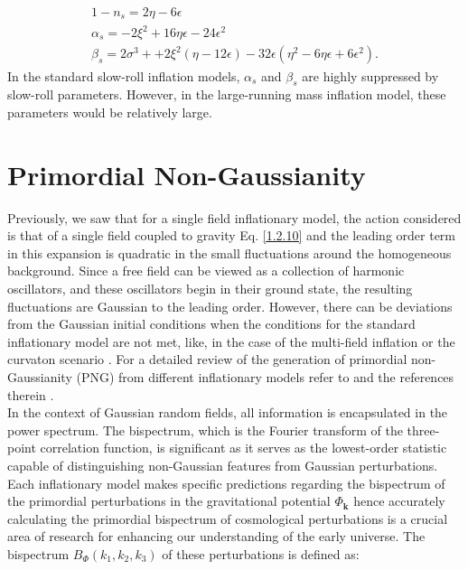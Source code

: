 \begin{align}
    1-n_{s} = 2\eta - 6\epsilon \\
    \alpha_s = -2\xi^2 + 16\eta\epsilon - 24\epsilon^2 \\
    \beta_{s} = 2\sigma^3 + + 2\xi^2(\eta -12\epsilon) - 32\epsilon(\eta^2 - 6\eta\epsilon + 6 \epsilon^2) \label{1.2.149}.
\end{align}
In the standard slow-roll inflation models, $\alpha_s$ and $\beta_{s}$ are highly suppressed by slow-roll parameters. However, in the large-running mass inflation model, these parameters would be
relatively large.

\section{Primordial Non-Gaussianity} \label{PNG}

Previously, we saw that for a single field inflationary model, the action considered is that of a single field coupled to gravity Eq. \eqref{1.2.10} and the leading order term in this expansion is quadratic in the small fluctuations around the homogeneous background. Since a free field can be viewed as a collection of harmonic oscillators, and these oscillators begin in their ground state, the resulting fluctuations are Gaussian to the leading order. However, there can be deviations from the Gaussian initial conditions \cite{Maldacena_2003} when the conditions for the standard inflationary model are not met, like, in the case of the multi-field inflation \cite{Polarski_1994} or the curvaton scenario \cite{Lyth_2002}. For a detailed review of the generation of primordial non-Gaussianity (PNG) from different inflationary models refer to \cite{Bartolo_2004} and the references therein .\\

In the context of Gaussian random fields, all information is encapsulated in the power spectrum. The bispectrum, which is the Fourier transform of the three-point correlation function, is significant as it serves as the lowest-order statistic capable of distinguishing non-Gaussian features from Gaussian perturbations.\\

Each inflationary model makes specific predictions regarding the bispectrum of the primordial perturbations in the gravitational potential $\Phi_{\mathbf{k}}$ hence accurately calculating the primordial bispectrum of cosmological perturbations is a crucial area of research for enhancing our understanding of the early universe. The bispectrum $B_{\Phi}\left(k_{1}, k_{2}, k_{3}\right)$ of these perturbations is defined as:

